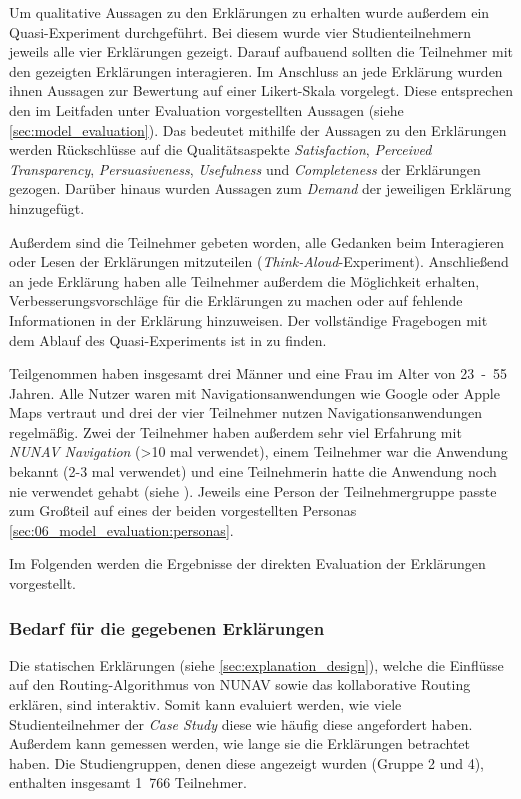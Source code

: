 Um qualitative Aussagen zu den Erklärungen zu erhalten wurde außerdem ein Quasi-Experiment durchgeführt. Bei diesem wurde vier Studienteilnehmern jeweils alle vier Erklärungen gezeigt. Darauf aufbauend sollten die Teilnehmer mit den gezeigten Erklärungen interagieren. Im Anschluss an jede Erklärung wurden ihnen Aussagen zur Bewertung auf einer Likert-Skala vorgelegt. Diese entsprechen den im Leitfaden unter Evaluation vorgestellten Aussagen (siehe \autoref{sec:model_evaluation}). Das bedeutet mithilfe der Aussagen zu den Erklärungen werden Rückschlüsse auf die Qualitätsaspekte \textit{Satisfaction}, \textit{Perceived Transparency}, \textit{Persuasiveness}, \textit{Usefulness} und \textit{Completeness} der Erklärungen gezogen. Darüber hinaus wurden Aussagen zum \textit{Demand} der jeweiligen Erklärung hinzugefügt.

Außerdem sind die Teilnehmer gebeten worden, alle Gedanken beim Interagieren oder Lesen der Erklärungen mitzuteilen (\textit{Think-Aloud}-Experiment). Anschließend an jede Erklärung haben alle Teilnehmer außerdem die Möglichkeit erhalten, Verbesserungsvorschläge für die Erklärungen zu machen oder auf fehlende Informationen in der Erklärung hinzuweisen. Der vollständige Fragebogen mit dem Ablauf des Quasi-Experiments ist in  zu finden.

Teilgenommen haben insgesamt drei Männer und eine Frau im Alter von 23~-~55 Jahren. Alle Nutzer waren mit Navigationsanwendungen wie Google oder Apple Maps vertraut und drei der vier Teilnehmer nutzen Navigationsanwendungen regelmäßig. Zwei der Teilnehmer haben außerdem sehr viel Erfahrung mit \textit{NUNAV Navigation} (>10 mal verwendet), einem Teilnehmer war die Anwendung bekannt (2-3 mal verwendet) und eine Teilnehmerin hatte die Anwendung noch nie verwendet gehabt (siehe ). Jeweils eine Person der Teilnehmergruppe passte zum Großteil auf eines der beiden vorgestellten Personas \autoref{sec:06_model_evaluation:personas}.

Im Folgenden werden die Ergebnisse der direkten Evaluation der Erklärungen vorgestellt.

\subsubsection{Bedarf für die gegebenen Erklärungen}
\label{sec:demand_qualitative_evaluation}

Die statischen Erklärungen (siehe \autoref{sec:explanation_design}), welche die Einflüsse auf den Routing-Algorithmus von NUNAV sowie das kollaborative Routing erklären, sind interaktiv. Somit kann evaluiert werden, wie viele Studienteilnehmer der \textit{Case Study} diese wie häufig diese angefordert haben. Außerdem kann gemessen werden, wie lange sie die Erklärungen betrachtet haben. Die Studiengruppen, denen diese angezeigt wurden (Gruppe 2 und 4), enthalten insgesamt 1~766 Teilnehmer.

